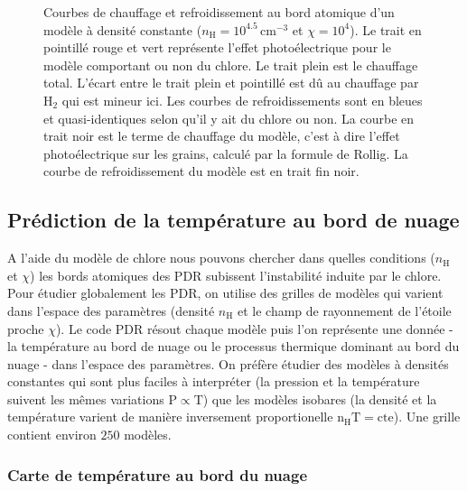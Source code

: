 \begin{figure}[!h]
\begin{subfigure}[t]{0.49\textwidth}
    \end{subfigure}
    \caption{Courbes de chauffage et refroidissement au bord atomique d'un modèle à densité constante ($n_\mathrm{H} = 10^{4.5} \,\mathrm{cm}^{-3}$ et $\chi = 10^4$). Le trait en pointillé rouge et vert représente l'effet photoélectrique pour le modèle comportant ou non du chlore.  Le trait plein est le chauffage total. L'écart entre le trait plein et pointillé est dû au chauffage par $\mathrm{H}_2$ qui est mineur ici. Les courbes de refroidissements sont en bleues et quasi-identiques selon qu'il y ait du chlore ou non. La courbe en trait noir est le terme de chauffage du modèle, c'est à dire l'effet photoélectrique sur les grains, calculé par la formule de Rollig. La courbe de refroidissement du modèle est en trait fin noir.}
    
\end{figure}




\subsection{Prédiction de la température au bord de nuage}
 
A l'aide du modèle de chlore nous pouvons chercher dans quelles conditions ($n_\mathrm{H}$ et $\chi$) les bords atomiques des PDR subissent l'instabilité induite par le chlore. Pour étudier globalement les PDR, on utilise des grilles de modèles qui varient dans l'espace des paramètres (densité $n_\mathrm{H}$ et le champ de rayonnement de l'étoile proche $\chi$). Le code PDR résout chaque modèle puis l'on représente une donnée - la température au bord de nuage ou le processus thermique dominant au bord du nuage - dans l'espace des paramètres. On préfère étudier des modèles à densités constantes qui sont plus faciles à interpréter (la pression et la température suivent les mêmes variations $\mathrm{P}\propto \mathrm{T}$) que les modèles isobares (la densité et la température varient de manière inversement proportionelle $\mathrm{n}_\mathrm{H}\mathrm{T}=\mathrm{cte}$). Une grille contient environ $250$ modèles.


\subsubsection{Carte de température au bord du nuage}

